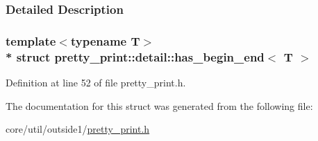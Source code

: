 \subsubsection{Detailed Description}
\subsubsection*{template$<$typename T$>$\\*
struct pretty\+\_\+print\+::detail\+::has\+\_\+begin\+\_\+end$<$ T $>$}



Definition at line 52 of file pretty\+\_\+print.\+h.



The documentation for this struct was generated from the following file\+:\begin{DoxyCompactItemize}
\item 
core/util/outside1/\hyperlink{pretty__print_8h}{pretty\+\_\+print.\+h}\end{DoxyCompactItemize}
